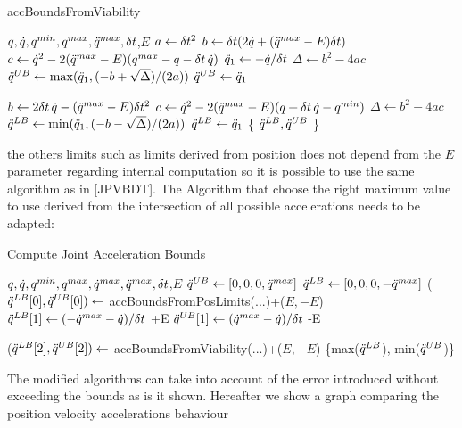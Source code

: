 \documentclass{article}
\begin{document}
\begin{algorithm}[H]
    \caption{accBoundsFromViability} 
    \label{alg:acc_bounds_from_viab_limits}
    \begin{algorithmic}[5]
        \Require $q, \dot{q}, q^{min}, q^{max}, \ddot{q}^{max}, \delta t$,$E$
    	\State $a \gets \delta t^2$
    	\State $b \gets \delta t (2 \dot{q} + (\ddot{q}^{max}-E) \delta t)$
    	\State $c \gets \dot{q}^2 - 2 (\ddot{q}^{max}-E) (q^{max} - q - \delta t \, \dot{q})$
	\State $\ddot{q}_1 \gets -\dot{q} / \delta t$ %
    	\State $\Delta \gets b^2 - 4 a c$
        		\State $\ddot{q}^{UB} \gets \max(\ddot{q}_1, (-b + \sqrt{\Delta}) / (2 a))$
    	\Else
        		\State $\ddot{q}^{UB} \gets \ddot{q}_1$
	\EndIf
    
    	\State $b \gets 2 \delta t \, \dot{q} - (\ddot{q}^{max}-E) \delta t^2$
    	\State $c \gets \dot{q}^2 - 2 (\ddot{q}^{max}-E) (q + \delta t \, \dot{q} - q^{min})$
    	\State $\Delta \gets b^2 - 4 a c$
        		\State $\ddot{q}^{LB} \gets \min(\ddot{q}_1, (-b - \sqrt{\Delta}) / (2 a))$ 
    	\Else
        		\State $\ddot{q}^{LB} \gets \ddot{q}_1$
	\EndIf
    	\State \Return \{ $\ddot{q}^{LB}, \ddot{q}^{UB}$ \}
    \end{algorithmic}
\end{algorithm}

 the others limits such as limits derived from position does not depend from the $E$ parameter regarding internal computation so it is possible to use the same algorithm as in [JPVBDT]. The Algorithm that choose the right maximum value to use derived from the intersection of all possible accelerations needs to be adapted:


\begin{algorithm}[H]
    \caption{Compute Joint Acceleration Bounds} 
    \label{alg:joint_acc_bounds}
    \begin{algorithmic}[5]
        \Require $q, \dot{q}, q^{min}, q^{max}, \dot{q}^{max}, \ddot{q}^{max}, \delta t$,$E$
        \State $\ddot{q}^{UB} \gets [0, 0, 0, \ddot{q}^{max}]$
        \State $\ddot{q}^{LB} \gets [0, 0, 0, -\ddot{q}^{max}]$
    	\State ($\ddot{q}^{LB}[0], \ddot{q}^{UB}[0]) \gets$ accBoundsFromPosLimits(...)+($E,-E$) %
    	\State $\ddot{q}^{LB}[1] \gets (-\dot{q}^{max}-\dot{q}) / \delta t$ +E
    	\State $\ddot{q}^{UB}[1] \gets (\dot{q}^{max}-\dot{q}) / \delta t$ -E
    
    	\State ($\ddot{q}^{LB}[2], \ddot{q}^{UB}[2]) \gets$ accBoundsFromViability(...)+($E,-E$) %
    	\State \Return \{max($\ddot{q}^{LB}$), min($\ddot{q}^{UB}$)\}

    \end{algorithmic}
\end{algorithm}
The modified algorithms can take into account of the error introduced without exceeding the bounds as is it shown. Hereafter we show a graph comparing the position velocity accelerations behaviour
\end{document}
